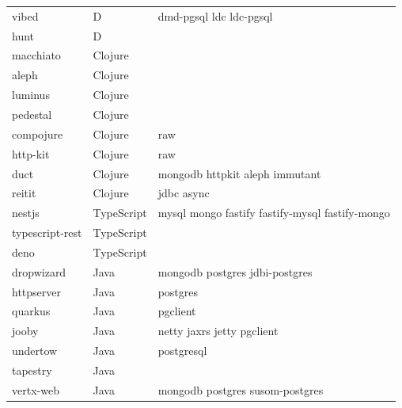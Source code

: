 \begin{longtable}{lll}
    vibed            & D           & dmd-pgsql ldc ldc-pgsql                            \\
    hunt             & D           &                                                    \\
    macchiato        & Clojure     &                                                    \\
    aleph            & Clojure     &                                                    \\
    luminus          & Clojure     &                                                    \\
    pedestal         & Clojure     &                                                    \\
    compojure        & Clojure     & raw                                                \\
    http-kit         & Clojure     & raw                                                \\
    duct             & Clojure     & mongodb httpkit aleph immutant                     \\
    reitit           & Clojure     & jdbc async                                         \\
    nestjs           & TypeScript  & mysql mongo fastify fastify-mysql fastify-mongo    \\
    typescript-rest  & TypeScript  &                                                    \\
    deno             & TypeScript  &                                                    \\
    dropwizard       & Java        & mongodb postgres jdbi-postgres                     \\
    httpserver       & Java        & postgres                                           \\
    quarkus          & Java        & pgclient                                           \\
    jooby            & Java        & netty jaxrs jetty pgclient                         \\
    undertow         & Java        & postgresql                                         \\
    tapestry         & Java        &                                                    \\
    vertx-web        & Java        & mongodb postgres susom-postgres                    \\

\end{longtable}
